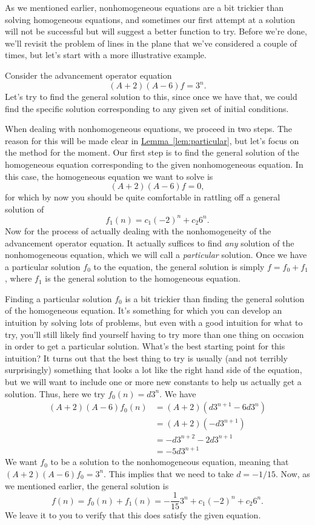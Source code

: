 As we mentioned earlier, nonhomogeneous equations are a bit trickier
than solving homogeneous equations, and sometimes our first attempt at
a solution will not be successful but will suggest a better function
to try. Before we're done, we'll revisit the problem of lines in the
plane that we've considered a couple of times, but let's start with a
more illustrative example.

\begin{example}
  Consider the advancement operator equation
  \[(A+2)(A-6)f=3^n.\]
  Let's try to find the general solution to this, since once we have
  that, we could find the specific solution corresponding to any given
  set of initial conditions.

  When dealing with nonhomogeneous equations, we proceed in two
  steps. The reason for this will be made clear in
  \hyperref[lem:particular]{Lemma~\ref*{lem:particular}}, but let's
  focus on the method for the moment. Our first step is to find the
  general solution of the homogeneous equation corresponding to the
  given nonhomogeneous equation. In this case, the homogeneous
  equation we want to solve is
  \[(A+2)(A-6)f=0,\]
  for which by now you should be quite comfortable in rattling off a
  general solution of 
  \[f_1(n) = c_1 (-2)^n + c_2 6^n.\]
  Now for the process of actually dealing with the nonhomogeneity of
  the advancement operator equation. It actually suffices to find
  \emph{any} solution of the nonhomogeneous equation, which we will
  call a \emph{particular} solution. Once we have a particular
  solution $f_0$ to the equation, the general solution is simply
  $f=f_0 + f_1$, where $f_1$ is the general solution to the
  homogeneous equation.

  Finding a particular solution $f_0$ is a bit trickier than finding
  the general solution of the homogeneous equation. It's something for
  which you can develop an intuition by solving lots of problems, but
  even with a good intuition for what to try, you'll still likely find
  yourself having to try more than one thing on occasion in order to
  get a particular solution. What's the best starting point for this
  intuition? It turns out that the best thing to try is usually (and
  not terribly surprisingly) something that looks a lot like the right
  hand side of the equation, but we will want to include one or more
  new constants
  to help us actually get a solution. Thus, here we try $f_0(n) = d 3^n$. We
  have
  \begin{align*}
    (A+2)(A-6)f_0(n) &= (A+2)(d3^{n+1}-6d3^n)\\
    & = (A+2)(-d3^{n+1})\\
    & = -d3^{n+2} -2d3^{n+1}\\
    & = -5d 3^{n+1}
  \end{align*}
  We want $f_0$ to be a solution to the nonhomogeneous equation,
  meaning that $(A+2)(A-6)f_0 = 3^n$. This implies that we need to
  take $d=-1/15$. Now, as we mentioned earlier, the general solution
  is
  \[f(n) = f_0(n) + f_1(n) = -\frac{1}{15}3^n + c_1 (-2)^n + c_2
  6^n.\]
  We leave it to you to verify that this does satisfy the given equation.
\end{example}

